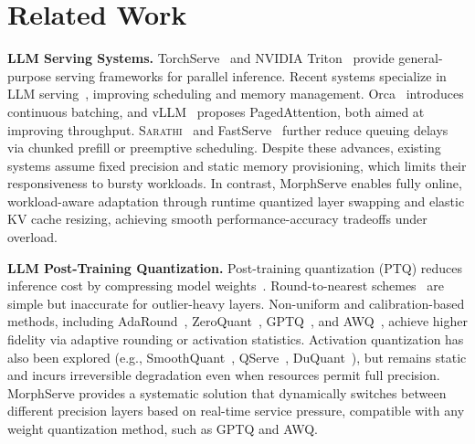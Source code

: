 \documentclass{article}
\newcommand{\system}{{MorphServe}\xspace}
\newcommand{\Sarathi}{\textsc{Sarathi}\xspace}
\begin{document}
\section{Related Work}

\noindent\textbf{LLM Serving Systems.}
TorchServe~\cite{torchserve} and NVIDIA Triton~\cite{triton} provide general-purpose serving frameworks for parallel inference. 
Recent systems specialize in LLM serving~\cite{fast_transformer, tgi}, improving scheduling and memory management. 
Orca~\cite{yu2022orca} introduces continuous batching, and vLLM~\cite{kwon2023efficient_vllm} proposes PagedAttention, both aimed at improving throughput. 
{\Sarathi}~\cite{agrawal2023sarathi} and FastServe~\cite{wu2023fastserve} further reduce queuing delays via chunked prefill or preemptive scheduling. 
Despite these advances, existing systems assume fixed precision and static memory provisioning, which limits their responsiveness to bursty workloads. 
In contrast, {\system} enables fully online, workload-aware adaptation through runtime quantized layer swapping and elastic KV cache resizing, achieving smooth performance-accuracy tradeoffs under overload.

\noindent\textbf{LLM Post-Training Quantization.}
Post-training quantization (PTQ) reduces inference cost by compressing model weights~\cite{dettmers2023spqr, kim2023squeezellm, li2024norm_quant, zhao2024atom, lin2024awq, frantar2022gptq, xiao2023smoothquant, lin2024duquant}. 
Round-to-nearest schemes~\cite{yao2023comprehensive_quant, nagel2021white_paper_quantization} are simple but inaccurate for outlier-heavy layers. 
Non-uniform and calibration-based methods, including AdaRound~\cite{nagel2020up_adaround}, ZeroQuant~\cite{yao2022zeroquant}, GPTQ~\cite{frantar2022gptq}, and AWQ~\cite{lin2024awq}, achieve higher fidelity via adaptive rounding or activation statistics. 
Activation quantization has also been explored (e.g., SmoothQuant~\cite{xiao2023smoothquant}, QServe~\cite{lin2024qserve}, DuQuant~\cite{lin2024duquant}), but remains static and incurs irreversible degradation even when resources permit full precision. 
{\system} provides a systematic solution that dynamically switches between different precision layers based on real-time service pressure, compatible with any weight quantization method, such as GPTQ and AWQ.
\end{document}
